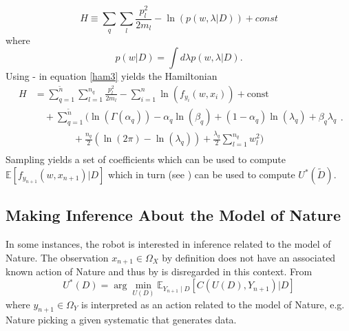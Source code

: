 \begin{equation}
	H \equiv  \sum_{q}\sum_{l}\frac{p_{l}^2}{2m_{l}}-\ln(p(w,\lambda|D))+const
	\label{ham3}
\end{equation}
where
\begin{equation}
	p(w|D) = \int d\lambda p(w,\lambda|D).
\end{equation}
Using - in equation \eqref{ham3} yields the Hamiltonian
\begin{equation}
	\begin{split}
		H&=\sum_{q=1}^{\tilde{n}}\sum_{l=1}^{n_q}\frac{p_{l}^2}{2m_{l}}-\sum_{i=1}^{n}\ln(f_{y_i}(w,x_i))+\text{const}\\
		&\quad+\sum_{q=1}^{\tilde{n}}\bigg(\ln(\Gamma(\alpha_q))-\alpha_q\ln(\beta_q)+(1-\alpha_q)\ln(\lambda_q)+\beta_q\lambda_q\\
		&\qquad \qquad+\frac{n_q}{2}(\ln(2\pi)-\ln(\lambda_q))+\frac{\lambda_q}{2}\sum_{l=1}^{n_q}w_l^2\bigg)\\
	\end{split}.
	\label{ham2}
\end{equation}
Sampling  yields a set of coefficients which can be used to compute $\mathbb{E}[f_{y_{n+1}}(w,x_{n+1})|D]$ which in turn (see ) can be used to compute $U^*(\tilde{D})$.


\subsection{Making Inference About the Model of Nature}
In some instances, the robot is interested in inference related to the model of Nature. The observation $x_{n+1}\in \Omega_X$ by definition does not have an associated known action of Nature and thus by  is disregarded in this context. From 
\begin{equation}
	U^*(D) = \arg\min_{U(D)} \mathbb{E}_{Y_{n+1}\mid D}[C(U(D), Y_{n+1})|D]
	\label{eq:best_decision}
\end{equation}
where $y_{n+1} \in \Omega_Y$ is interpreted as an action related to the model of Nature, e.g. Nature picking a given systematic that generates data.


